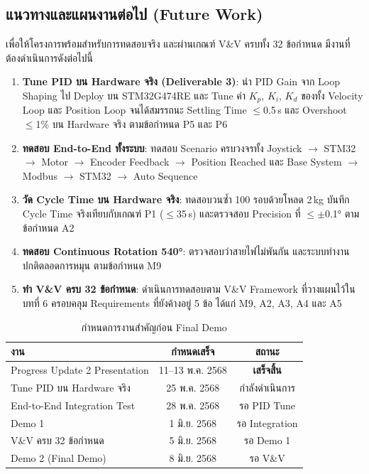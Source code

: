 \subsection{แนวทางและแผนงานต่อไป (Future Work)}
\label{subsec:future_work}

เพื่อให้โครงการพร้อมสำหรับการทดสอบจริง
และผ่านเกณฑ์ V\&V ครบทั้ง 32 ข้อกำหนด
มีงานที่ต้องดำเนินการดังต่อไปนี้

\begin{enumerate}
  \item \textbf{Tune PID บน Hardware จริง (Deliverable 3)}:
        นำ PID Gain จาก Loop Shaping ไป Deploy
        บน STM32G474RE และ Tune ค่า $K_p$, $K_i$, $K_d$
        ของทั้ง Velocity Loop และ Position Loop
        จนได้สมรรถนะ Settling Time $\leq$0.5\,s
        และ Overshoot $\leq$1\% บน Hardware จริง
        ตามข้อกำหนด P5 และ P6

  \item \textbf{ทดสอบ End-to-End ทั้งระบบ}:
        ทดสอบ Scenario ครบวงจรทั้ง
        Joystick $\rightarrow$ STM32
        $\rightarrow$ Motor $\rightarrow$
        Encoder Feedback $\rightarrow$ Position Reached
        และ Base System $\rightarrow$ Modbus
        $\rightarrow$ STM32 $\rightarrow$ Auto Sequence

  \item \textbf{วัด Cycle Time บน Hardware จริง}:
        ทดสอบวนซ้ำ 100 รอบด้วยโหลด 2\,kg
        บันทึก Cycle Time จริงเทียบกับเกณฑ์ P1
        ($\leq$35\,s) และตรวจสอบ Precision
        ที่ $\leq \pm$0.1° ตามข้อกำหนด A2

  \item \textbf{ทดสอบ Continuous Rotation 540°}:
        ตรวจสอบว่าสายไฟไม่พันกัน
        และระบบทำงานปกติตลอดการหมุน
        ตามข้อกำหนด M9

  \item \textbf{ทำ V\&V ครบ 32 ข้อกำหนด}:
        ดำเนินการทดสอบตาม V\&V Framework
        ที่วางแผนไว้ในบทที่ 6 ครอบคลุม
        Requirements ที่ยังค้างอยู่ 5 ข้อ
        ได้แก่ M9, A2, A3, A4 และ A5
\end{enumerate}

\begin{table}[H]
  \centering
  \caption{กำหนดการงานสำคัญก่อน Final Demo}
  \label{tab:schedule}
  \begin{tabular}{lcc}
    \toprule
    งาน & กำหนดเสร็จ & สถานะ \\
    \midrule
    Progress Update 2 Presentation
      & 11--13 พ.ค. 2568
      & \textbf{เสร็จสิ้น} \\
    Tune PID บน Hardware จริง
      & 25 พ.ค. 2568
      & กำลังดำเนินการ \\
    End-to-End Integration Test
      & 28 พ.ค. 2568
      & รอ PID Tune \\
    Demo 1
      & 1 มิ.ย. 2568
      & รอ Integration \\
    V\&V ครบ 32 ข้อกำหนด
      & 5 มิ.ย. 2568
      & รอ Demo 1 \\
    Demo 2 (Final Demo)
      & 8 มิ.ย. 2568
      & รอ V\&V \\
    \bottomrule
  \end{tabular}
\end{table}